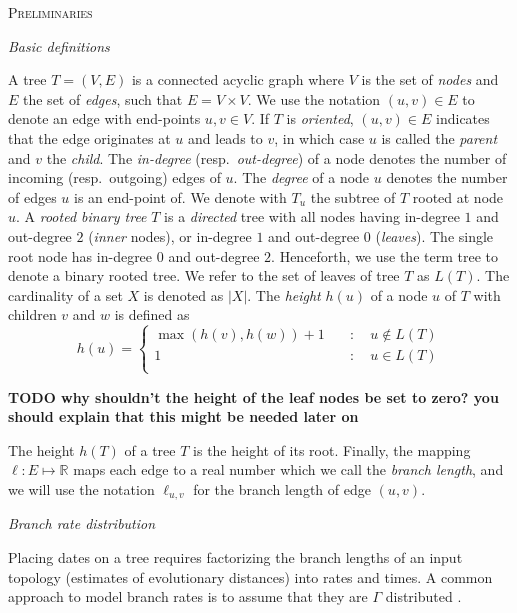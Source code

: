 \documentclass{llncs}
\renewcommand{\section}[1]{%
\bigskip
\begin{center}
\begin{Large}
\normalfont\scshape #1
\medskip
\end{Large}
\end{center}}
\renewcommand{\subsection}[1]{%
\bigskip
\begin{center}
\begin{large}
\normalfont\itshape #1
\end{large}
\end{center}}
\begin{document}
\section {Preliminaries}
%
%
\subsection{Basic definitions}
%
A tree $T=(V,E)$ is a connected acyclic graph where $V$ is the set of {\em
nodes} and $E$ the set of {\em edges}, such that $E = V\times V$. We use the
notation $(u,v) \in E$ to denote an edge with end-points $u,v \in V$. If $T$ is
{\em oriented}, $(u,v) \in E$ indicates that the edge originates at $u$ and leads
to $v$, in which case $u$ is called the {\em parent} and $v$ the {\em child}.
The {\em in-degree} (resp.~{\em out-degree}) of a node denotes the
number of incoming (resp.~outgoing) edges of $u$. The
{\em degree} of a node $u$ denotes the number of edges $u$ is an end-point of.
We denote with $T_u$ the subtree of $T$ rooted at node $u$.  A {\em
rooted binary tree} $T$ is a {\em directed} tree with all nodes having
in-degree $1$ and out-degree $2$ ({\em inner} nodes), or in-degree $1$ and out-degree
$0$ ({\em leaves}). The single root node has in-degree $0$ and out-degree $2$.  
Henceforth, we use the term tree to denote a
binary rooted tree.  We refer to the set of leaves of tree $T$ as $L(T)$.  The
cardinality of a set $X$ is denoted as $|X|$. The {\em height} $h(u)$ of a node
$u$ of $T$ with children $v$ and $w$ is defined as 
%
\[ h(u) = \left\{ \begin{array}{ll}
\max(h(v), h(w)) + 1 & \quad : \quad u \notin L(T)\\
1                    & \quad : \quad u    \in L(T)\\
\end{array}\right. \] 

{\bf TODO why shouldn't the height of the leaf nodes be set to zero? you should explain that this might be needed later on}

The height $h(T)$ of a tree $T$ is the height of its root. Finally, the mapping $\ell : E \mapsto \mathbb{R}$ maps
each edge to a real number which we call the {\em branch length}, and we will use the notation $\ell_{u,v}$ for
the branch length of edge $(u,v)$.

\subsection{Branch rate distribution}
Placing dates on a tree requires factorizing the branch lengths of an input topology (estimates of evolutionary distances) 
into rates and times. 
A common approach to model branch rates is to assume that they are $\Gamma$ distributed \citep{Kishino2001}.
\end{document}
